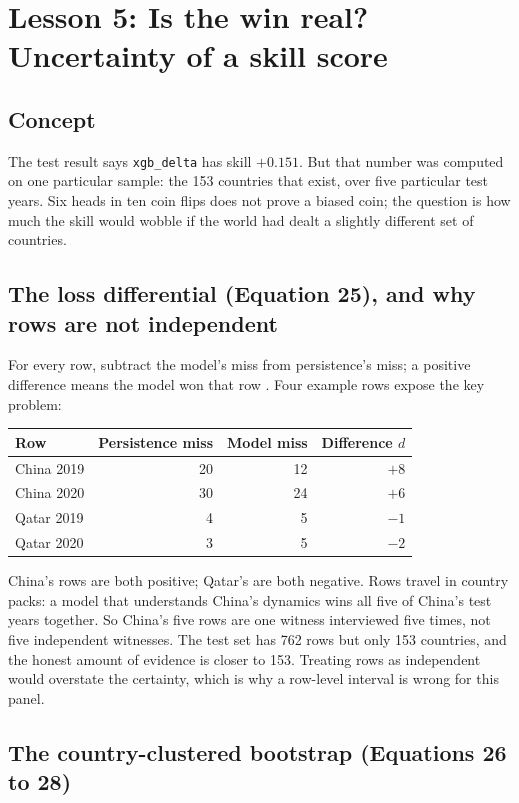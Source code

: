 \documentclass[11pt]{article}
\begin{document}
\section{Lesson 5: Is the win real? Uncertainty of a skill score}

\subsection{Concept}

The test result says \texttt{xgb\_delta} has skill $+0.151$. But that
number was computed on one particular sample: the 153 countries that
exist, over five particular test years. Six heads in ten coin flips does
not prove a biased coin; the question is how much the skill would wobble
if the world had dealt a slightly different set of countries.

\subsection{The loss differential (Equation 25), and why rows are not independent}

For every row, subtract the model's miss from persistence's miss; a
positive difference means the model won that row
\cite{diebold1995comparing}. Four example rows expose the key problem:

\begin{center}
\begin{tabular}{lrrr}
\toprule
Row & Persistence miss & Model miss & Difference $d$ \\
\midrule
China 2019 & 20 & 12 & $+8$ \\
China 2020 & 30 & 24 & $+6$ \\
Qatar 2019 & 4 & 5 & $-1$ \\
Qatar 2020 & 3 & 5 & $-2$ \\
\bottomrule
\end{tabular}
\end{center}

China's rows are both positive; Qatar's are both negative. Rows travel in
country packs: a model that understands China's dynamics wins all five of
China's test years together. So China's five rows are one witness
interviewed five times, not five independent witnesses. The test set has
762 rows but only 153 countries, and the honest amount of evidence is
closer to 153. Treating rows as independent would overstate the
certainty, which is why a row-level interval is wrong for this panel.

\subsection{The country-clustered bootstrap (Equations 26 to 28)}
\end{document}
